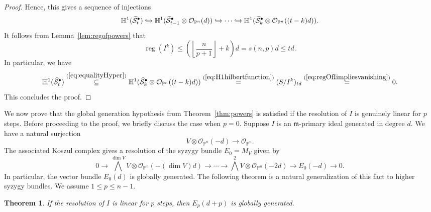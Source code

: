 \documentclass[11pt,letterpaper,reqno]{amsart}
\newcommand{\m}{\mathfrak{m}}
\newcommand{\reg}{\operatorname{reg}}
\newcommand{\mc}[1]{\mathcal{#1}}
\def\PP{{\mathbb P}}
\def\lra{\longrightarrow}
\newtheorem{theorem}{Theorem}[section]
\theoremstyle{definition}
\numberwithin{equation}{section}
\begin{document}
\begin{proof}
    Hence, this gives a sequence of injections
    \begin{equation}\label{eq:equalityHyper}
        \mathbb{H}^1(\widehat{\mc{S}}^\bullet_t) \xhookrightarrow{} \mathbb{H}^1(\widehat{\mc{S}}^\bullet_{t-1}\otimes \mc{O}_{\PP^n}(d)) \xhookrightarrow{} \cdots \xhookrightarrow{} \mathbb{H}^1(\widehat{\mc{S}}^\bullet_{k}\otimes \mc{O}_{\PP^n}((t-k)d)).
    \end{equation}
    It follows from Lemma~\ref{lem:regofpowers} that
    \[\reg(I^k) \le \left(\left\lfloor \frac{n}{p+1}\right\rfloor + k \right)d = s(n,p)d \le td.\]
    In particular, we have
    \[\mathbb{H}^1(\widehat{\mc{S}}^\bullet_t) \overset{(\ref{eq:equalityHyper})}{\subseteq} \mathbb{H}^1(\widehat{\mc{S}}^\bullet_{k}\otimes \mc{O}_{\PP^n}((t-k)d)) \overset{(\ref{eq:H1hilbertfunction})}{=} (S/I^k)_{td} \overset{(\ref{eq:regOfIimpliesvanishing})}{=} 0.\]
    This concludes the proof.
\end{proof}
We now prove that the global generation hypothesis from Theorem~\ref{thm:powers} is satisfied if the resolution of $I$ is genuinely linear for $p$ steps. Before proceeding to the proof, we briefly discuss the case when $p = 0$. Suppose $I$ is an $\m$-primary ideal generated in degree $d$. We have a natural surjection
\[V \otimes \mc{O}_{\PP^n}(-d) \lra \mc{O}_{\PP^n}.\]
The associated Koszul complex gives a resolution of the syzygy bundle $E_0 = M_V$ given by
\[0 \lra \bigwedge^{\dim V}V \otimes \mc{O}_{\PP^n}(-(\dim V)d) \lra \cdots \lra \bigwedge^2 V \otimes \mc{O}_{\PP^n}(-2d) \lra E_0(-d) \lra 0.\]
In particular, the vector bundle $E_0(d)$ is globally generated. The following theorem is a natural generalization of this fact to higher syzygy bundles. We assume $1 \le p \le n-1$.
\begin{theorem}\label{lem:gg}
    If the resolution of $I$ is linear for $p$ steps, then $E_p(d+p)$ is globally generated.
\end{theorem}
\end{document}
